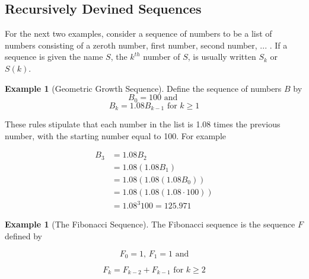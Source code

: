 \documentclass[10pt,]{book}
\theoremstyle{plain}
\theoremstyle{definition}
\theoremstyle{definition}
\theoremstyle{definition}
\newtheorem{example}[theorem]{Example}
\theoremstyle{definition}
\numberwithin{equation}{section}
\begin{document}
\subsection[Recursively Devined Sequences]{Recursively Devined Sequences}\label{ss-recursive-sequences}
For the next two examples, consider a sequence of numbers to be a list of numbers consisting of a zeroth number, first number, second number, ... . If a sequence is given the name \(S\), the \(k^{th}\) number of \(S\), is usually written \(S_k\)  or \(S(k)\).%
\begin{example}[Geometric Growth Sequence]\label{ex-geometric-growth}
 Define the sequence of numbers \(B\) by
\begin{equation*}  B_0 = 100\textrm{ and }\end{equation*}  
\begin{equation*}  B_k = 1.08 B_{k-1} \textrm{ for } k\geq 1 \end{equation*}%
\par
These rules stipulate that each number in the list is 1.08 times the previous number, with the starting number equal to 100. For example

\begin{equation*}
\begin{split}
B_3 &= 1.08 B_2 \\
	&=1.08\left(1.08B_1\right)\\
	&= 1.08\left(1.08\left(1.08 B_0\right)\right)\\
	& = 1.08(1.08(1.08\cdot 100))\\
	&= 1.08^3 100 = 125.971
\end{split}
\end{equation*}
%
\end{example}
\begin{example}[The Fibonacci Sequence]\label{ex-fibonacci-sequence}
The Fibonacci sequence is the sequence \(F\) defined by 

\begin{equation*}F_0= 1 \textrm{, } F_1= 1\textrm{ and}\end{equation*} 

\begin{equation*}F_k = F_{k-2} + F_{k-1} \textrm{ for }k\geq 2\end{equation*}
%
\end{example}
\typeout{************************************************}
\typeout{************************************************}
\end{document}
